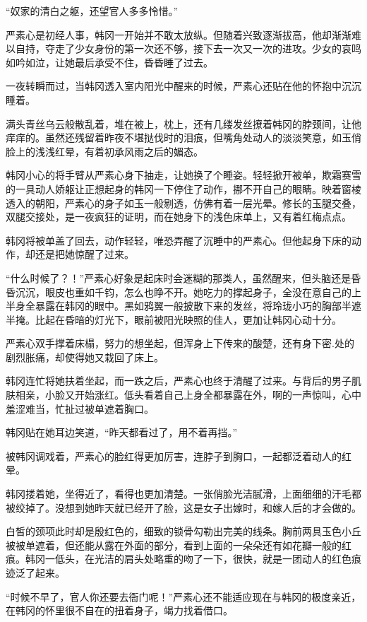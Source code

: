 “奴家的清白之躯，还望官人多多怜惜。”

严素心是初经人事，韩冈一开始并不敢太放纵。但随着兴致逐渐拔高，他却渐渐难以自持，夺走了少女身份的第一次还不够，接下去一次又一次的进攻。少女的哀鸣如吟如泣，让她最后承受不住，昏昏睡了过去。

一夜转瞬而过，当韩冈透入室内阳光中醒来的时候，严素心还贴在他的怀抱中沉沉睡着。

满头青丝乌云般散乱着，堆在被上，枕上，还有几缕发丝撩着韩冈的脖颈间，让他痒痒的。虽然还残留着昨夜不堪挞伐时的泪痕，但嘴角处动人的淡淡笑意，如玉俏脸上的浅浅红晕，有着初承风雨之后的媚态。

韩冈小心的将手臂从严素心身下抽走，让她换了个睡姿。轻轻掀开被单，欺霜赛雪的一具动人娇躯让正想起身的韩冈一下停住了动作，挪不开自己的眼睛。映着窗棱透入的朝阳，严素心的身子如玉一般剔透，仿佛有着一层光晕。修长的玉腿交叠，双腿交接处，是一夜疯狂的证明，而在她身下的浅色床单上，又有着红梅点点。

韩冈将被单盖了回去，动作轻轻，唯恐弄醒了沉睡中的严素心。但他起身下床的动作，却还是把她惊醒了过来。

“什么时候了？！”严素心好象是起床时会迷糊的那类人，虽然醒来，但头脑还是昏昏沉沉，眼皮也重如千钧，怎么也睁不开。她吃力的撑起身子，全没在意自己的上半身全暴露在韩冈的眼中。黑如鸦翼一般披散下来的发丝，将玲珑小巧的胸部半遮半掩。比起在昏暗的灯光下，眼前被阳光映照的佳人，更加让韩冈心动十分。

严素心双手撑着床榻，努力的想坐起，但浑身上下传来的酸楚，还有身下密.处的剧烈胀痛，却使得她又栽回了床上。

韩冈连忙将她扶着坐起，而一跌之后，严素心也终于清醒了过来。与背后的男子肌肤相亲，小脸又开始涨红。低头看着自己上身全都暴露在外，啊的一声惊叫，心中羞涩难当，忙扯过被单遮着胸口。

韩冈贴在她耳边笑道，“昨天都看过了，用不着再挡。”

被韩冈调戏着，严素心的脸红得更加厉害，连脖子到胸口，一起都泛着动人的红晕。

韩冈搂着她，坐得近了，看得也更加清楚。一张俏脸光洁腻滑，上面细细的汗毛都被绞掉了。没想到她昨天就已经开了脸，这是女子出嫁时，和嫁人后的才会做的。

白皙的颈项此时却是殷红色的，细致的锁骨勾勒出完美的线条。胸前两具玉色小丘被被单遮着，但还能从露在外面的部分，看到上面的一朵朵还有如花瓣一般的红痕。韩冈一低头，在光洁的肩头处略重的吻了一下，很快，就是一团动人的红色痕迹泛了起来。

“时候不早了，官人你还要去衙门呢！”严素心还不能适应现在与韩冈的极度亲近，在韩冈的怀里很不自在的扭着身子，竭力找着借口。

